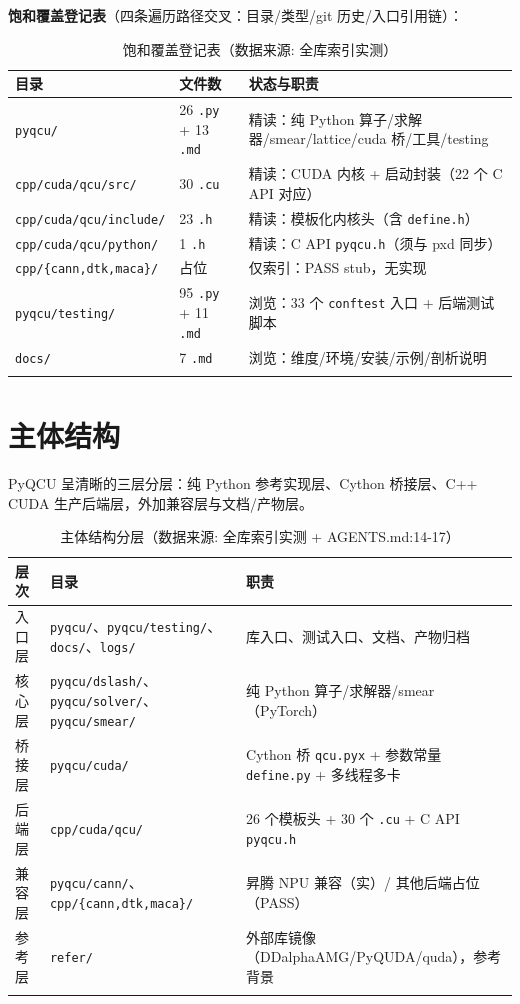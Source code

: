 \documentclass[UTF8]{ctexart}
\begin{document}
\textbf{饱和覆盖登记表}（四条遍历路径交叉：目录/类型/git 历史/入口引用链）：

\begin{xltabular}{\textwidth}{llX}
\toprule
\textcolor{struct}{目录} & 文件数 & \textcolor{struct}{状态与职责} \\
\midrule
\endhead
\texttt{pyqcu/} & 26 \texttt{.py} + 13 \texttt{.md} & 精读：纯 Python 算子/求解器/smear/lattice/cuda 桥/工具/testing \\
\texttt{cpp/cuda/qcu/src/} & 30 \texttt{.cu} & 精读：CUDA 内核 + 启动封装（22 个 C API 对应） \\
\texttt{cpp/cuda/qcu/include/} & 23 \texttt{.h} & 精读：模板化内核头（含 \texttt{define.h}） \\
\texttt{cpp/cuda/qcu/python/} & 1 \texttt{.h} & 精读：C API \texttt{pyqcu.h}（须与 pxd 同步） \\
\texttt{cpp/\{cann,dtk,maca\}/} & 占位 & 仅索引：PASS stub，无实现 \\
\texttt{pyqcu/testing/} & 95 \texttt{.py} + 11 \texttt{.md} & 浏览：33 个 \texttt{conftest} 入口 + 后端测试脚本 \\
\texttt{docs/} & 7 \texttt{.md} & 浏览：维度/环境/安装/示例/剖析说明 \\
\bottomrule
\caption{饱和覆盖登记表（数据来源: 全库索引实测）}
\end{xltabular}

\section{主体结构}

PyQCU 呈清晰的三层分层：纯 Python 参考实现层、Cython 桥接层、C++ CUDA 生产后端层，外加兼容层与文档/产物层。

\begin{xltabular}{\textwidth}{llX}
\toprule
\textcolor{struct}{层次} & 目录 & \textcolor{struct}{职责} \\
\midrule
\endhead
入口层 & \texttt{pyqcu/}、\texttt{pyqcu/testing/}、\texttt{docs/}、\texttt{logs/} & 库入口、测试入口、文档、产物归档 \\
核心层 & \texttt{pyqcu/dslash/}、\texttt{pyqcu/solver/}、\texttt{pyqcu/smear/} & 纯 Python 算子/求解器/smear（PyTorch） \\
桥接层 & \texttt{pyqcu/cuda/} & Cython 桥 \texttt{qcu.pyx} + 参数常量 \texttt{define.py} + 多线程多卡 \\
后端层 & \texttt{cpp/cuda/qcu/} & 26 个模板头 + 30 个 \texttt{.cu} + C API \texttt{pyqcu.h} \\
兼容层 & \texttt{pyqcu/cann/}、\texttt{cpp/\{cann,dtk,maca\}/} & 昇腾 NPU 兼容（实）/ 其他后端占位（PASS） \\
参考层 & \texttt{refer/} & 外部库镜像（DDalphaAMG/PyQUDA/quda），参考背景 \\
\bottomrule
\caption{主体结构分层（数据来源: 全库索引实测 + AGENTS.md:14-17）}
\end{xltabular}
\end{document}
